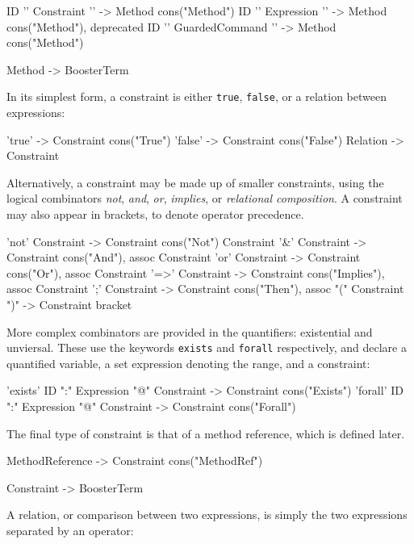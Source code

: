 \begin{code}
ID '{' Constraint '}'     -> Method {cons("Method")}
ID '{' Expression '}'     -> Method {cons("Method"), deprecated}
ID '{' GuardedCommand '}' -> Method {cons("Method")}

Method -> BoosterTerm
\end{code}

In its simplest form, a constraint is either \verb|true|,
\verb|false|, or a relation between expressions: 

\begin{code}
'true'                          -> Constraint {cons("True")}
'false' 			-> Constraint {cons("False")}
Relation 			-> Constraint 
\end{code}

Alternatively, a constraint may be made up of smaller constraints,
using the logical combinators \emph{not}, \emph{and}, \emph{or},
\emph{implies}, or \emph{relational composition}.  A constraint may
also appear in brackets, to denote operator precedence.

\begin{code}
'not' Constraint		-> Constraint { cons("Not")}
Constraint '&' Constraint 	-> Constraint { cons("And"), assoc}
Constraint 'or' Constraint 	-> Constraint { cons("Or"), assoc}
Constraint '=>' Constraint 	-> Constraint { cons("Implies"), assoc}
Constraint ';' Constraint 	-> Constraint { cons("Then"), assoc}
"(" Constraint ")" 		-> Constraint { bracket}
\end{code}

More complex combinators are provided in the quantifiers: existential
and unviersal.  These use the keywords \verb|exists| and \verb|forall|
respectively, and declare a quantified variable, a set expression
denoting the range, and a constraint:
\begin{code}
'exists' ID ":" Expression "@" Constraint -> Constraint {cons("Exists")}
'forall' ID ":" Expression "@" Constraint -> Constraint {cons("Forall")}
\end{code}

The final type of constraint is that of a method reference, which is
defined later.
\begin{code}
MethodReference -> Constraint {cons("MethodRef")}

Constraint -> BoosterTerm 
\end{code}
	 
A relation, or comparison between two expressions, is simply the two
expressions separated by an operator:

